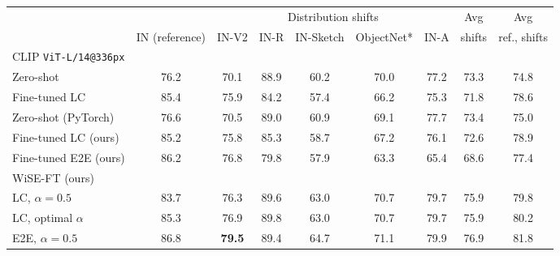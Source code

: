 \begin{table}
\setlength\tabcolsep{5.1pt}
\small
\begin{center}
\begin{tabular}{lc|ccccc|cc}
\toprule
{} &            &             \multicolumn{5}{c|}{Distribution shifts}             &                    Avg &                        Avg\\
{} &           IN (reference) &             IN-V2 &              IN-R &                 IN-Sketch &                 ObjectNet* &              IN-A &                    shifts &                        ref., shifts\\
\midrule
CLIP \texttt{ViT-L/14@336px} & & & & & & & &\\
\quad Zero-shot \cite{radford2021learning} &                    76.2 &                    70.1 &                    88.9 &                             60.2 &                             70.0 &                    77.2 &                             73.3 &                             74.8 \\
\quad  Fine-tuned LC \cite{radford2021learning} &                    85.4 &                    75.9 &                    84.2 &                             57.4 &                             66.2 &                    75.3 &                             71.8 &                             78.6 \\
\quad  Zero-shot (PyTorch)                   &                    76.6 &                    70.5 &                    89.0 &                             60.9 &                             69.1 &                    77.7 &                             73.4 &                             75.0 \\
\quad  Fine-tuned LC (ours)              &                    85.2 &                    75.8 &                    85.3 &                             58.7 &                             67.2 &                    76.1 &                             72.6 &                             78.9 \\
\quad  Fine-tuned E2E (ours)                     &                    86.2 &                    76.8 &                    79.8 &                             57.9 &                             63.3 &                    65.4 &                             68.6 &                             77.4 \\\midrule
\quad  WiSE-FT (ours) & & & & & & & &\\
\quad \quad LC, $\alpha{=}0.5$     &                    83.7 &                    76.3 &                    89.6 &  63.0 &  70.7 &  79.7 &  75.9 &  79.8 \\
\quad \quad LC, optimal $\alpha$        &                    85.3 &                    76.9 &                    89.8 &                             63.0 &                             70.7 &                    79.7 &                             75.9 &                             80.2 \\
\quad \quad E2E, $\alpha{=}0.5$ &                    86.8 &  \textbf{79.5} &                    89.4 &                    64.7 &                    71.1 &                    79.9 &                    76.9 &                    81.8 \\


\end{tabular}
\end{center}
\end{table}
